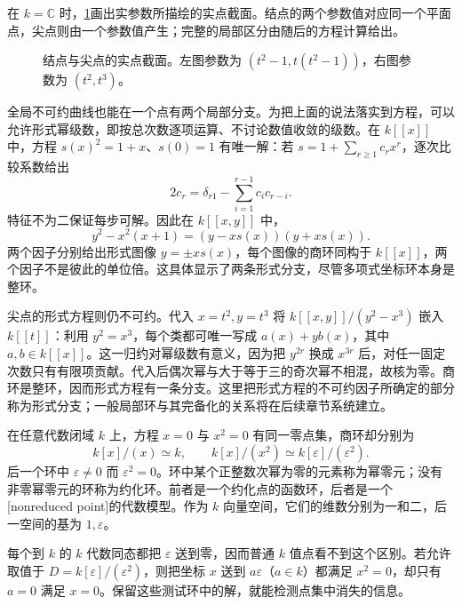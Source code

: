 \ProseParagraphBreak

在 \(k=\mathbb C\) 时，\cref{g5:fig:node-cusp}画出实参数所描绘的实点截面。结点的两个参数值对应同一个平面点，尖点则由一个参数值产生；完整的局部区分由随后的方程计算给出。
\begin{figure}[htbp]
	\centering
	
	\caption[结点与尖点的参数模型]{结点与尖点的实点截面。左图参数为 \((t^2-1,t(t^2-1))\)，右图参数为 \((t^2,t^3)\)。}
	\label{g5:fig:node-cusp}
\end{figure}
全局不可约曲线也能在一个点有两个局部分支。为把上面的说法落实到方程，可以允许形式幂级数，即按总次数逐项运算、不讨论数值收敛的级数。在 \(k[[x]]\) 中，方程 \(s(x)^2=1+x\)、\(s(0)=1\) 有唯一解：若 \(s=1+\sum_{r\ge1}c_rx^r\)，逐次比较系数给出
\[
	2c_r=\delta_{r1}-\sum_{i=1}^{r-1}c_i c_{r-i}.
\]
特征不为二保证每步可解。因此在 \(k[[x,y]]\) 中，
\[
	y^2-x^2(x+1)=(y-xs(x))(y+xs(x)).
\]
两个因子分别给出形式图像 \(y=\pm xs(x)\)，每个图像的商环同构于 \(k[[x]]\)，两个因子不是彼此的单位倍。这具体显示了两条形式分支，尽管多项式坐标环本身是整环。

\ProseParagraphBreak

尖点的形式方程则仍不可约。代入 \(x=t^2,y=t^3\) 将
\(k[[x,y]]/(y^2-x^3)\) 嵌入 \(k[[t]]\)：利用 \(y^2=x^3\)，每个类都可唯一写成 \(a(x)+yb(x)\)，其中 \(a,b\in k[[x]]\)。这一归约对幂级数有意义，因为把 \(y^{2r}\) 换成 \(x^{3r}\) 后，对任一固定次数只有有限项贡献。代入后偶次幂与大于等于三的奇次幂不相混，故核为零。商环是整环，因而形式方程有一条分支。这里把形式方程的不可约因子所确定的部分称为形式分支；一般局部环与其完备化的关系将在后续章节系统建立。

\begin{example}\label{g5:exm:nonreduced-point}
	在任意代数闭域 \(k\) 上，方程 \(x=0\) 与 \(x^2=0\) 有同一零点集，商环却分别为
	\[
		k[x]/(x)\simeq k,\qquad
		k[x]/(x^2)\simeq k[\varepsilon]/(\varepsilon^2).
	\]
	后一个环中 \(\varepsilon\ne0\) 而 \(\varepsilon^2=0\)。环中某个正整数次幂为零的元素称为幂零元；没有非零幂零元的环称为约化环。前者是一个约化点的函数环，后者是一个[nonreduced point]的代数模型。作为 \(k\) 向量空间，它们的维数分别为一和二，后一空间的基为 \(1,\varepsilon\)。

	每个到 \(k\) 的 \(k\) 代数同态都把 \(\varepsilon\) 送到零，因而普通 \(k\) 值点看不到这个区别。若允许取值于 \(D=k[\varepsilon]/(\varepsilon^2)\)，则把坐标 \(x\) 送到 \(a\varepsilon\)（\(a\in k\)）都满足 \(x^2=0\)，却只有 \(a=0\) 满足 \(x=0\)。保留这些测试环中的解，就能检测点集中消失的信息。
\end{example}

